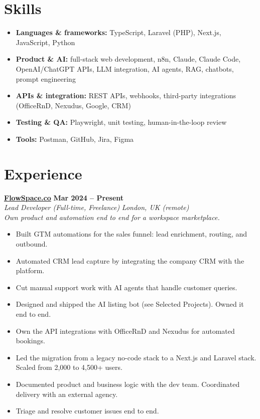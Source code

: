 \documentclass[a4paper,7pt]{article}
\newcommand{\role}[4]{%
 \textbf{#1} \hfill \textbf{#2}\\[0pt]%
 \textit{#3} \hfill \textit{#4}\\[0pt]%
}
\begin{document}
\section{Skills}
\begin{itemize}
 \item \textbf{Languages \& frameworks:} TypeScript, Laravel (PHP), Next.js, JavaScript, Python
 \item \textbf{Product \& AI:} full-stack web development, n8n, Claude, Claude Code, OpenAI/ChatGPT APIs, LLM integration, AI agents, RAG, chatbots, prompt engineering
 \item \textbf{APIs \& integration:} REST APIs, webhooks, third-party integrations (OfficeRnD, Nexudus, Google, CRM)
 \item \textbf{Testing \& QA:} Playwright, unit testing, human-in-the-loop review
 \item \textbf{Tools:} Postman, GitHub, Jira, Figma
\end{itemize}

\section{Experience}

\role{\href{https://flowspace.co}{FlowSpace.co}}{Mar 2024 -- Present}{Lead Developer (Full-time, Freelance)}{London, UK (remote)}
\textit{Own product and automation end to end for a workspace marketplace.}
\begin{itemize}
 \item Built GTM automations for the sales funnel: lead enrichment, routing, and outbound.
 \item Automated CRM lead capture by integrating the company CRM with the platform.
 \item Cut manual support work with AI agents that handle customer queries.
 \item Designed and shipped the AI listing bot (see Selected Projects). Owned it end to end.
 \item Own the API integrations with OfficeRnD and Nexudus for automated bookings.
 \item Led the migration from a legacy no-code stack to a Next.js and Laravel stack. Scaled from 2,000 to 4,500+ users.
 \item Documented product and business logic with the dev team. Coordinated delivery with an external agency.
 \item Triage and resolve customer issues end to end.
\end{itemize}
\end{document}
